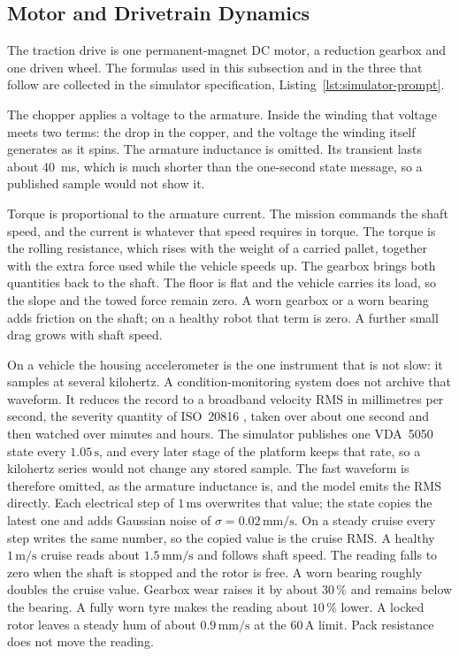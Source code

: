 \subsection{Motor and Drivetrain Dynamics}

The traction drive is one permanent-magnet DC motor, a reduction gearbox and one driven wheel. The formulas used in this subsection and in the three that follow are collected in the simulator specification, Listing~\ref{lst:simulator-prompt}.

The chopper applies a voltage to the armature. Inside the winding that voltage meets two terms: the drop in the copper, and the voltage the winding itself generates as it spins. The armature inductance is omitted. Its transient lasts about 40~ms, which is much shorter than the one-second state message, so a published sample would not show it. 

Torque is proportional to the armature current. The mission commands the shaft speed, and the current is whatever that speed requires in torque. The torque is the rolling resistance, which rises with the weight of a carried pallet, together with the extra force used while the vehicle speeds up. The gearbox brings both quantities back to the shaft. The floor is flat and the vehicle carries its load, so the slope and the towed force remain zero. A worn gearbox or a worn bearing adds friction on the shaft; on a healthy robot that term is zero. A further small drag grows with shaft speed.

On a vehicle the housing accelerometer is the one instrument that is not slow: it samples at several kilohertz. A condition-monitoring system does not archive that waveform. It reduces the record to a broadband velocity RMS in millimetres per second, the severity quantity of ISO~20816 \cite{iso20816}, taken over about one second and then watched over minutes and hours. The simulator publishes one VDA~5050 state every $1.05\,\mathrm{s}$, and every later stage of the platform keeps that rate, so a kilohertz series would not change any stored sample. The fast waveform is therefore omitted, as the armature inductance is, and the model emits the RMS directly. Each electrical step of $1\,\mathrm{ms}$ overwrites that value; the state copies the latest one and adds Gaussian noise of $\sigma = 0.02\,\mathrm{mm/s}$. On a steady cruise every step writes the same number, so the copied value is the cruise RMS. A healthy $1\,\mathrm{m/s}$ cruise reads about $1.5\,\mathrm{mm/s}$ and follows shaft speed. The reading falls to zero when the shaft is stopped and the rotor is free. A worn bearing roughly doubles the cruise value. Gearbox wear raises it by about $30\,\%$ and remains below the bearing. A fully worn tyre makes the reading about $10\,\%$ lower. A locked rotor leaves a steady hum of about $0.9\,\mathrm{mm/s}$ at the $60\,\mathrm{A}$ limit. Pack resistance does not move the reading.

